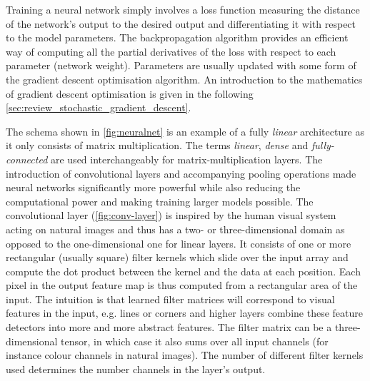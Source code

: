 Training a neural network simply involves a loss function measuring the distance
of the network's output to the desired output and differentiating it with respect
to the model parameters. The backpropagation algorithm provides an efficient way
of computing all the partial derivatives of the loss with respect to each
parameter (network weight). Parameters are usually updated with some form of the
gradient descent optimisation algorithm. An introduction to the mathematics of
gradient descent optimisation is given in the following \cref{sec:review_stochastic_gradient_descent}.

The schema shown in \cref{fig:neuralnet} is an example of a fully \emph{linear}
architecture as it only consists of matrix multiplication. The terms
\emph{linear}, \emph{dense} and \emph{fully-connected} are used interchangeably
for matrix-multiplication layers. The introduction of convolutional layers and
accompanying pooling operations made neural networks significantly more powerful
while also reducing the computational power and making training larger models
possible. The convolutional layer (\cref{fig:conv-layer}) is inspired by the
human visual system acting on natural images and thus has a two- or
three-dimensional domain as opposed to the one-dimensional one for linear
layers. It consists of one or more rectangular (usually square) filter kernels
which slide over the input array and compute the dot product between the kernel
and the data at each position. Each pixel in the output feature map is thus
computed from a rectangular area of the input. The intuition is that learned
filter matrices will correspond to visual features in the input, e.g. lines or
corners and higher layers combine these feature detectors into more and more
abstract features. The filter matrix can be a three-dimensional tensor, in which
case it also sums over all input channels (for instance colour channels in
natural images).  The number of different filter kernels used determines the
number channels in the layer's output.

